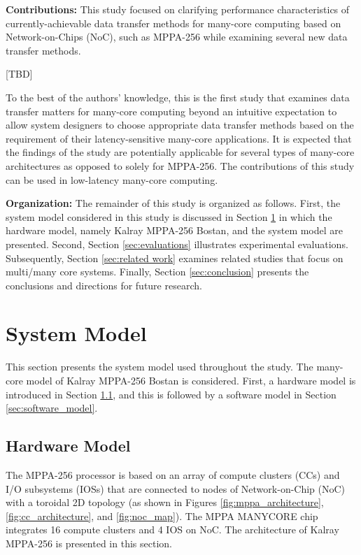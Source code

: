 \documentclass{sig-alternate-05-2015}
\begin{document}
\textbf{Contributions:}
This study focused on clarifying performance characteristics of currently-achievable data transfer methods for many-core computing based on Network-on-Chips (NoC), such as MPPA-256
while examining several new data transfer methods. %

[TBD]

To the best of the authors' knowledge, this is the first study that examines data transfer matters for many-core computing beyond an intuitive expectation to allow system designers to choose appropriate data transfer methods based on the requirement of their latency-sensitive many-core applications.
It is expected that the findings of the study are potentially applicable for several types of many-core architectures as opposed to solely for MPPA-256.
The contributions of this study can be used in low-latency many-core computing.

\textbf{Organization:}
The remainder of this study is organized as follows.
First, the system model considered in this study is discussed in Section \ref{sec:system_model} in which the hardware model, namely Kalray MPPA-256 Bostan, and the system model are presented.
Second, Section \ref{sec:evaluations} illustrates experimental evaluations.
Subsequently, Section \ref{sec:related work} examines related studies that focus on multi/many core systems.
Finally, Section \ref{sec:conclusion} presents the conclusions and directions for future research.


\section{System Model}
\label{sec:system_model}
This section presents the system model used throughout the study.
The many-core model of Kalray MPPA-256 Bostan is considered.
First, a hardware model is introduced in Section \ref{sec:hardware_model}, and this is followed by a software model in Section \ref{sec:software_model}.

\subsection{Hardware Model}
\label{sec:hardware_model}
The MPPA-256 processor is based on an array of compute clusters (CCs) and I/O subsystems (IOSs) that are connected to nodes of Network-on-Chip (NoC) with a toroidal 2D topology 
(as shown in Figures \ref{fig:mppa_architecture}, \ref{fig:cc_architecture}, and \ref{fig:noc_map}).
The MPPA MANYCORE chip integrates 16 compute clusters and 4 IOS on NoC.
The architecture of Kalray MPPA-256 is presented in this section.
\end{document}
